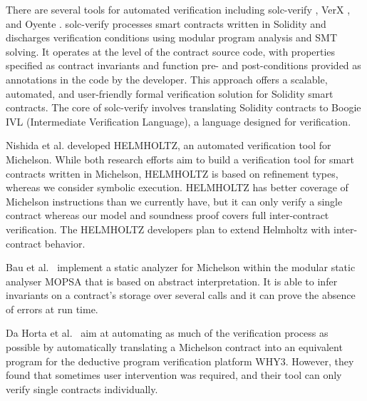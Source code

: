 There are several tools for automated verification including
solc-verify \cite{solc}, VerX \cite{verx}, and Oyente
\cite{oyente}. solc-verify processes smart contracts written in
Solidity and discharges verification conditions using modular program
analysis and SMT solving. It operates at the level of the contract
source code, with properties specified as contract invariants and
function pre- and post-conditions provided as annotations in the code
by the developer. This approach offers a scalable, automated, and
user-friendly formal verification solution for Solidity smart
contracts. The core of solc-verify involves translating Solidity
contracts to Boogie IVL (Intermediate Verification Language), a
language designed for verification.  

Nishida et al. \cite{helmholtz} developed HELMHOLTZ, an automated
verification tool for Michelson. While both research efforts aim to
build a verification tool for smart contracts written in Michelson,
HELMHOLTZ is based on  refinement types, whereas we consider symbolic
execution.
HELMHOLTZ has better coverage of Michelson instructions than we
currently have, but it can only verify a single contract whereas our
model and soundness proof covers full inter-contract verification.
The HELMHOLTZ developers plan to extend Helmholtz with inter-contract behavior.




Bau et al.~\cite{abstract-interpretation} implement a static analyzer for Michelson
within the modular static analyser MOPSA that is based on abstract interpretation.
It is able to infer invariants on a contract's storage over several calls
and it can prove the absence of errors at run time.

Da Horta et al.~\cite{why3} aim at automating as much of the verification process as possible
by automatically translating a Michelson contract into an equivalent program
for the deductive program verification platform WHY3.
However, they found that sometimes user intervention was required,
and their tool can only verify single contracts individually.

